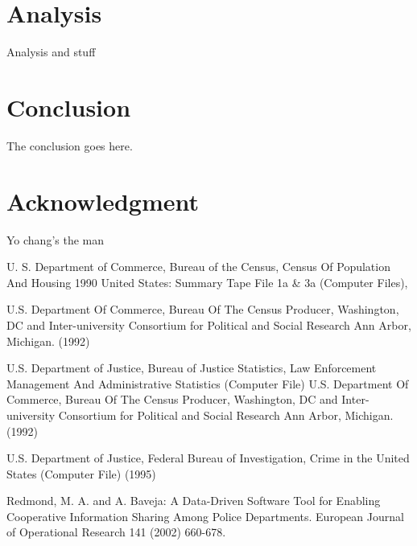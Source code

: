 \documentclass[9pt, conference]{IEEEtran}
\begin{document}
\section{Analysis}
Analysis and stuff
\section{Conclusion}
The conclusion goes here.






\section*{Acknowledgment}
Yo chang's the man






U. S. Department of Commerce, Bureau of the Census, Census Of Population And Housing 1990 United States: Summary Tape File 1a \& 3a (Computer Files),

U.S. Department Of Commerce, Bureau Of The Census Producer, Washington, DC and 
Inter-university Consortium for Political and Social Research Ann Arbor, Michigan. 
(1992)

U.S. Department of Justice, Bureau of Justice Statistics, Law Enforcement Management 
And Administrative Statistics (Computer File) U.S. Department Of Commerce, Bureau Of 
The Census Producer, Washington, DC and Inter-university Consortium for Political and 
Social Research Ann Arbor, Michigan. (1992)

U.S. Department of Justice, Federal Bureau of Investigation, Crime in the United 
States (Computer File) (1995)

Redmond, M. A. and A. Baveja: A Data-Driven Software Tool for Enabling Cooperative 
Information Sharing Among Police Departments. European Journal of Operational Research 
141 (2002) 660-678. 



\end{document}
